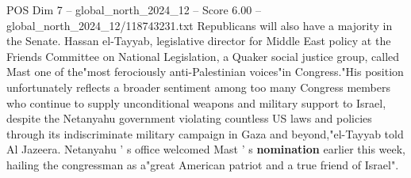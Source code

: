 \begin{textsample}{POS Dim 7 – global\_north\_2024\_12 – Score 6.00 – global\_north\_2024\_12/118743231.txt}
Republicans will also have a majority in the Senate.
Hassan el-Tayyab, legislative director for Middle East policy at the Friends Committee on National Legislation, a Quaker social justice group, called Mast one of the"most ferociously anti-Palestinian voices"in Congress."His position unfortunately reflects a broader sentiment among too many Congress members who continue to supply unconditional weapons and military support to Israel, despite the Netanyahu government violating countless US laws and policies through its indiscriminate military campaign in Gaza and beyond,"el-Tayyab told Al Jazeera.
Netanyahu ' s office welcomed Mast ' s \textbf{nomination} earlier this week, hailing the congressman as a"great American patriot and a true friend of Israel".

\end{textsample}
